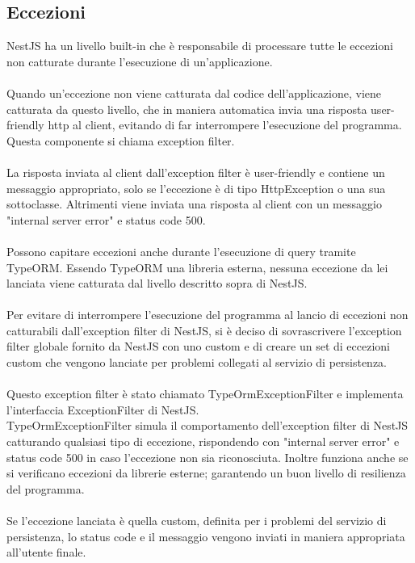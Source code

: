 \subsection{Eccezioni}
NestJS ha un livello built-in che è responsabile di processare tutte le eccezioni non catturate durante 
l'esecuzione di un'applicazione.
\\\\
Quando un'eccezione non viene catturata dal codice dell'applicazione, viene catturata da questo livello,
che in maniera automatica invia una risposta user-friendly http al client, evitando di far interrompere 
l'esecuzione del programma. Questa componente si chiama exception filter.
\\\\
La risposta inviata al client dall'exception filter è user-friendly e contiene un messaggio appropriato, solo se l'eccezione è di tipo HttpException o 
una sua sottoclasse. 
Altrimenti viene inviata una risposta al client con un messaggio "internal server error" e status code 500.
\\\\
Possono capitare eccezioni anche durante l'esecuzione di query tramite TypeORM. Essendo TypeORM una libreria
esterna, nessuna eccezione da lei lanciata viene catturata dal livello descritto sopra di NestJS.
\\\\
Per evitare di interrompere l'esecuzione del programma al lancio di eccezioni non catturabili dall'exception filter di NestJS,
 si è deciso di 
sovrascrivere l'exception filter globale fornito da NestJS con uno custom e di creare un set di eccezioni
custom che vengono lanciate per problemi collegati al servizio di persistenza.
\\\\
Questo exception filter è stato chiamato TypeOrmExceptionFilter e implementa l'interfaccia ExceptionFilter di
NestJS. 
\\
TypeOrmExceptionFilter simula il comportamento dell'exception filter di NestJS catturando qualsiasi
tipo di eccezione, rispondendo con "internal server error" e status code 500 in caso l'eccezione non sia riconosciuta.
Inoltre funziona anche se si verificano eccezioni da librerie esterne; garantendo un buon livello di resilienza
del programma. 
\\\\
Se l'eccezione lanciata è quella custom, definita per i problemi del servizio di persistenza, lo status code e il messaggio 
vengono inviati in maniera
appropriata all'utente finale.
